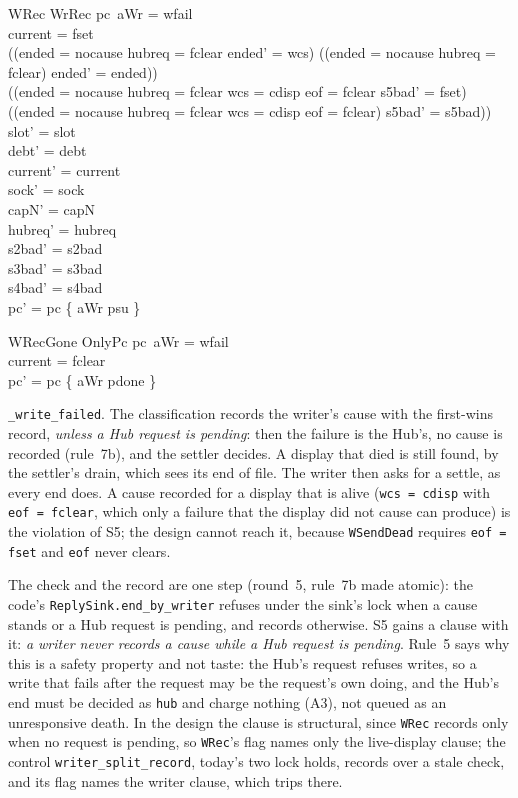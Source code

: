 \documentclass[a4paper,10pt,fleqn]{article}
\begin{document}
\begin{schema}{WRec}
  WrRec
\where
  pc~aWr = wfail \\
  current = fset \\
  ((ended = nocause \land hubreq = fclear \land ended' = wcs) \lor
    (\lnot (ended = nocause \land hubreq = fclear) \land ended' = ended)) \\
  ((ended = nocause \land hubreq = fclear \land wcs = cdisp \land eof = fclear \land
      s5bad' = fset) \lor
    (\lnot (ended = nocause \land hubreq = fclear \land wcs = cdisp \land
      eof = fclear) \land s5bad' = s5bad)) \\
  slot' = slot \\
  debt' = debt \\
  current' = current \\
  sock' = sock \\
  capN' = capN \\
  hubreq' = hubreq \\
  s2bad' = s2bad \\
  s3bad' = s3bad \\
  s4bad' = s4bad \\
  pc' = pc \oplus \{ aWr \mapsto psu \}
\end{schema}

\begin{schema}{WRecGone}
  OnlyPc
\where
  pc~aWr = wfail \\
  current = fclear \\
  pc' = pc \oplus \{ aWr \mapsto pdone \}
\end{schema}

\texttt{\_write\_failed}.  The classification records the writer's cause with the
first-wins record, \emph{unless a Hub request is pending}: then the failure is the
Hub's, no cause is recorded (rule~7b), and the settler decides.  A display that
died is still found, by the settler's drain, which sees its end of file.  The
writer then asks for a settle, as every end does.  A cause recorded for a display
that is alive (\texttt{wcs = cdisp} with \texttt{eof = fclear}, which only a
failure that the display did not cause can produce) is the violation of S5; the
design cannot reach it, because \texttt{WSendDead} requires \texttt{eof = fset}
and \texttt{eof} never clears.

The check and the record are one step (round~5, rule~7b made atomic): the code's
\texttt{ReplySink.end\_by\_writer} refuses under the sink's lock when a cause stands
or a Hub request is pending, and records otherwise.  S5 gains a clause with it:
\emph{a writer never records a cause while a Hub request is pending}.  Rule~5 says
why this is a safety property and not taste: the Hub's request refuses writes, so
a write that fails after the request may be the request's own doing, and the
Hub's end must be decided as \texttt{hub} and charge nothing (A3), not queued as
an unresponsive death.  In the design the clause is structural, since
\texttt{WRec} records only when no request is pending, so \texttt{WRec}'s flag
names only the live-display clause; the control \texttt{writer\_split\_record},
today's two lock holds, records over a stale check, and its flag names the
writer clause, which trips there.
\end{document}
